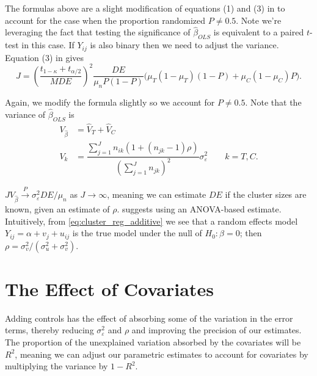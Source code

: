 \documentclass{article}
\begin{document}
The formulas above are a slight modification of equations (1) and (3) in \citet{manatunga_sample_2001} to account for the case when the proportion randomized $P \ne 0.5$. Note we're leveraging the fact that testing the significance of $\widehat{\beta}_{OLS}$ is equivalent to a paired $t$-test in this case. If $Y_{ij}$ is also binary then we need to adjust the variance. Equation (3) in \citet{kong_sample_2003} gives
\begin{equation}
J = \left(\dfrac{t_{1 - \kappa} + t_{\alpha / 2}}{MDE}\right)^2 \dfrac{DE}{\mu_n P(1 - P)}
    \Big(\mu_T (1 - \mu_T) (1 - P) + \mu_C (1 - \mu_C) P\Big).
\end{equation}

Again, we modify the formula slightly so we account for $P \ne 0.5$. Note that the variance of $\widehat{\beta}_{OLS}$ is
\begin{equation}
\begin{array}{rl}
    V_{\widehat{\beta}} & = \widehat{V}_T + \widehat{V}_C \\
    V_{k} & = \dfrac{\sum^{J}_{j = 1} n_{ik} \left(1 + (n_{jk} - 1) \rho\right)}{\left(\sum^{J}_{j = 1} n_{jk}\right)^2} \sigma^2_{\varepsilon}
        \quad\quad k = T, C.
  \end{array}
\end{equation}

$J V_{\widehat{\beta}} \xrightarrow{P} \sigma^2_{\varepsilon} DE / \mu_n$ as $J \to \infty$, meaning we can estimate $DE$ if the cluster sizes are known, given an estimate of $\rho$. \citeauthor{kong_sample_2003} suggests using an ANOVA-based estimate. Intuitively, from \cref{eq:cluster_reg_additive} we see that a random effects model $Y_{ij} = \alpha + v_j + u_{ij}$ is the true model under the null of $H_0: \beta = 0$; then $\rho = \sigma_v^2 / (\sigma_u^2 + \sigma_v^2)$.

\section{The Effect of Covariates}
\label{sec:the_effect_of_covariates}

Adding controls has the effect of absorbing some of the variation in the error terms, thereby reducing $\sigma_\varepsilon^2$ and $\rho$ and improving the precision of our estimates. The proportion of the unexplained variation absorbed by the covariates will be $R^2$, meaning we can adjust our parametric estimates to account for covariates by multiplying the variance by $1 - R^2$.
\end{document}
